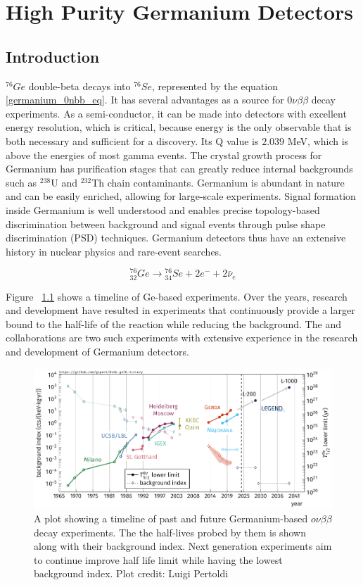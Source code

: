 \chapter{High Purity Germanium Detectors}
\label{chap:detectors}

\section{Introduction}
${}^{76}Ge$ double-beta decays into ${}^{76}Se$, represented by the equation \ref{germanium_0nbb_eq}. It has several advantages as a source for $0\nu\beta\beta$ decay experiments. As a semi-conductor, it can be made into detectors with excellent energy resolution, which is critical, because energy is the only observable that is both necessary and sufficient for a discovery. Its Q value is $2.039$ MeV, which is above the energies of most gamma events. The crystal growth process for Germanium has purification stages that can greatly reduce internal backgrounds such as $^{238}$U and $^{232}$Th chain contaminants. Germanium is abundant in nature and can be easily enriched, allowing for large-scale experiments. Signal formation inside Germanium is well understood and enables precise topology-based discrimination between background and signal events through pulse shape discrimination (PSD) techniques. Germanium detectors thus have an extensive history in nuclear physics and rare-event searches.


\begin{equation}\label{germanium_0nbb_eq}
{}_{32}^{76}Ge \rightarrow {}_{34}^{76}Se + 2e^- + 2\bar{\nu}_e
\end{equation}

Figure ~\ref{past_ge_exp} shows a timeline of Ge-based experiments. Over the years, research and development have resulted in experiments that continuously provide a larger bound to the half-life of the reaction while reducing the background. The {\MJ} and {\Gerda} collaborations are two such experiments with extensive experience in the research and development of Germanium detectors.

\begin{figure}[!htb]
\centering
\includegraphics[trim=0.1cm 0 0.1cm 0,clip, width=0.99\linewidth]{ch2/figs/0nbb-ge76-history-future.pdf}
\caption{A plot showing a timeline of past and future Germanium-based $o\nu\beta\beta$ decay experiments. The the half-lives probed by them is shown along with their background index. Next generation experiments aim to continue improve half life limit while having the lowest background index. Plot credit: Luigi Pertoldi}
\label{past_ge_exp}
\end{figure}



